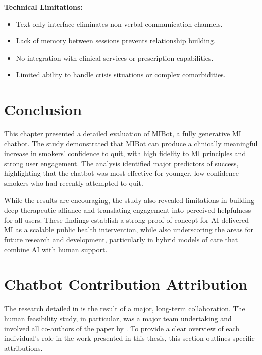 \textbf{Technical Limitations:}
\begin{itemize}
	\item Text-only interface eliminates non-verbal communication channels.
	\item Lack of memory between sessions prevents relationship building.
	\item No integration with clinical services or prescription capabilities.
	\item Limited ability to handle crisis situations or complex comorbidities.
\end{itemize}

\section{Conclusion}
\label{sec:conclusion}

This chapter presented a detailed evaluation of MIBot, a fully generative MI chatbot. The study demonstrated that MIBot can produce a clinically meaningful increase in smokers' confidence to quit, with high fidelity to MI principles and strong user engagement. The analysis identified major predictors of success, highlighting that the chatbot was most effective for younger, low-confidence smokers who had recently attempted to quit.

While the results are encouraging, the study also revealed limitations in building deep therapeutic alliance and translating engagement into perceived helpfulness for all users. These findings establish a strong proof-of-concept for AI-delivered MI as a scalable public health intervention, while also underscoring the areas for future research and development, particularly in hybrid models of care that combine AI with human support.


\section*{Chatbot Contribution Attribution}

The research detailed in  is the result of a major, long-term collaboration. The human feasibility study, in particular, was a major team undertaking and involved all co-authors of the paper by \citet{mahmood-etal-2025-fully}. To provide a clear overview of each individual's role in the work presented in this thesis, this section outlines specific attributions.

